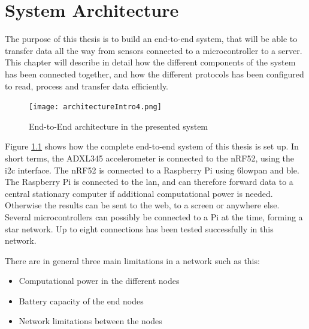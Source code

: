 \chapter{System Architecture}
\label{chp:architecture} 

The purpose of this thesis is to build an end-to-end system, that will be able to transfer data all the way from sensors connected to a \gls{microcontroller} to a server. This chapter will describe in detail how the different components of the system has been connected together, and how the different protocols has been configured to read, process and transfer data efficiently. 

\begin{figure}[ht]
    \centering
    \texttt{[image: architectureIntro4.png]}    
    \caption{End-to-End architecture in the presented system}
    \label{fig:systemArchitectureThisSystem}
\end{figure}


Figure \ref{fig:systemArchitectureThisSystem} shows how the complete end-to-end system of this thesis is set up. In short terms, the \gls{ADXL345} accelerometer is connected to the \gls{nRF52}, using the \gls{i2c} interface. The \gls{nRF52} is connected to a  \gls{Raspberry Pi} using \gls{6lowpan} and \gls{ble}. The \gls{Raspberry Pi} is connected to the \gls{lan}, and can therefore forward data to a central stationary computer if additional computational power is needed. Otherwise the results can be sent to the web, to a screen or anywhere else. Several \glspl{microcontroller} can possibly be connected to a Pi at the time, forming a star network. Up to eight connections has been tested successfully in this network. 
 
\noindent There are in general three main limitations in a network such as this:

\begin{itemize}
  \item Computational power in the different nodes
  \item Battery capacity of the end nodes
  \item Network limitations between the nodes
\end{itemize}



